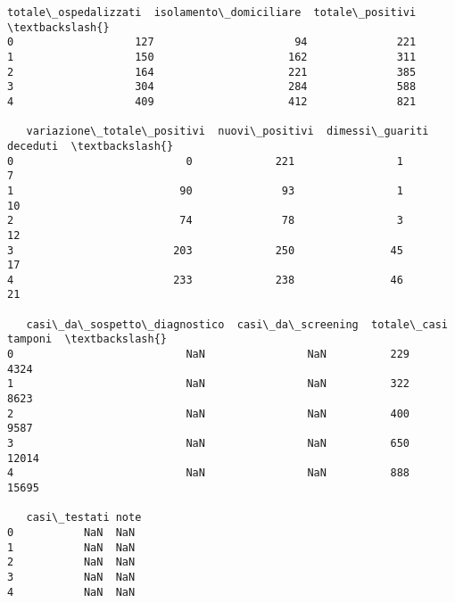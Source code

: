 \documentclass[11pt]{article}
\begin{document}
\begin{Verbatim}[commandchars=\\\{\}]
   totale\_ospedalizzati  isolamento\_domiciliare  totale\_positivi  \textbackslash{}
0                   127                      94              221
1                   150                     162              311
2                   164                     221              385
3                   304                     284              588
4                   409                     412              821

   variazione\_totale\_positivi  nuovi\_positivi  dimessi\_guariti  deceduti  \textbackslash{}
0                           0             221                1         7
1                          90              93                1        10
2                          74              78                3        12
3                         203             250               45        17
4                         233             238               46        21

   casi\_da\_sospetto\_diagnostico  casi\_da\_screening  totale\_casi  tamponi  \textbackslash{}
0                           NaN                NaN          229     4324
1                           NaN                NaN          322     8623
2                           NaN                NaN          400     9587
3                           NaN                NaN          650    12014
4                           NaN                NaN          888    15695

   casi\_testati note
0           NaN  NaN
1           NaN  NaN
2           NaN  NaN
3           NaN  NaN
4           NaN  NaN
    \end{Verbatim}
\end{document}
